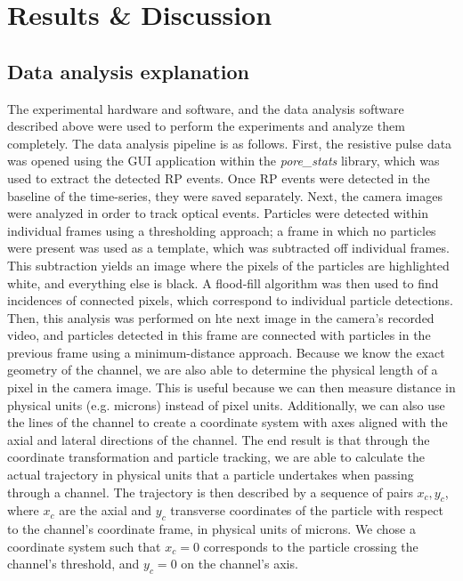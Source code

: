 	\section{Results \& Discussion}
		
		\subsection{Data analysis explanation}
		
		The experimental hardware and software, and the data analysis software described above were used to perform the experiments and analyze them completely. The data analysis pipeline is as follows. First, the resistive pulse data was opened using the GUI application within the \textit{pore\_stats} library, which was used to extract the detected RP events. Once RP events were detected in the baseline of the time-series, they were saved separately. Next, the camera images were analyzed in order to track optical events. Particles were detected within individual frames using a thresholding approach; a frame in which no particles were present was used as a template, which was subtracted off individual frames. This subtraction yields an image where the pixels of the particles are highlighted white, and everything else is black. A flood-fill algorithm was then used to find incidences of connected pixels, which correspond to individual particle detections. Then, this analysis was performed on hte next image in the camera's recorded video, and particles detected in this frame are connected with particles in the previous frame using a minimum-distance approach. Because we know the exact geometry of the channel, we are also able to determine the physical length of a pixel in the camera image. This is useful because we can then measure distance in physical units (e.g. microns) instead of pixel units. Additionally, we can also use the lines of the channel to create a coordinate system with axes aligned with the axial and lateral directions of the channel. The end result is that through the coordinate transformation and particle tracking, we are able to calculate the actual trajectory in physical units that a particle undertakes when passing through a channel. The trajectory is then described by a sequence of pairs $x_{c}, y_{c}$, where $x_{c}$ are the axial and $y_{c}$ transverse coordinates of the particle with respect to the channel's coordinate frame, in physical units of microns. We chose a coordinate system such that $x_{c}=0$ corresponds to the particle crossing the channel's threshold, and $y_{c}=0$ on the channel's axis.
		
